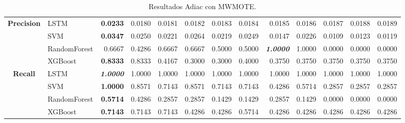 \begin{table}[H]
\begin{adjustbox}{max width=12cm}
\begin{tabular}{|c|l|r|r|r|r|r|r|r|r|r|r|r|}
			\hline
			\textbf{Precision} &  LSTM & \textbf{  0.0233 } &  0.0180 &  0.0181 &  0.0182 &  0.0183 &  0.0184 &  0.0185 &  0.0186 &  0.0187 &  0.0188 &  0.0189 \\
			&  SVM & \textbf{  0.0347 } &  0.0250 &  0.0221 &  0.0264 &  0.0219 &  0.0249 &  0.0147 &  0.0226 &  0.0109 &  0.0123 &  0.0119 \\
			&  RandomForest &  0.6667 &  0.4286 &  0.6667 &  0.6667 &  0.5000 &  0.5000 & \textit{ \textbf{  1.0000 } } &  1.0000 &  0.0000 &  0.0000 &  0.0000 \\
			&  XGBoost & \textbf{  0.8333 } &  0.8333 &  0.4167 &  0.3000 &  0.3000 &  0.4000 &  0.3750 &  0.3750 &  0.3750 &  0.3750 &  0.3750 \\
			\hline
			\textbf{Recall} &  LSTM & \textit{ \textbf{  1.0000 } } &  1.0000 &  1.0000 &  1.0000 &  1.0000 &  1.0000 &  1.0000 &  1.0000 &  1.0000 &  1.0000 &  1.0000 \\
			&  SVM & \textbf{  1.0000 } &  0.8571 &  0.7143 &  0.8571 &  0.7143 &  0.7143 &  0.4286 &  0.5714 &  0.2857 &  0.2857 &  0.2857 \\
			&  RandomForest & \textbf{  0.5714 } &  0.4286 &  0.2857 &  0.2857 &  0.1429 &  0.1429 &  0.2857 &  0.1429 &  0.0000 &  0.0000 &  0.0000 \\
			&  XGBoost & \textbf{  0.7143 } &  0.7143 &  0.7143 &  0.4286 &  0.4286 &  0.5714 &  0.4286 &  0.4286 &  0.4286 &  0.4286 &  0.4286 \\
			\hline
		\end{tabular}
	\end{adjustbox}
	\caption{Resultados Adiac con MWMOTE.}
	\label{tab:Adiac_MWMOTE}
\end{table}
